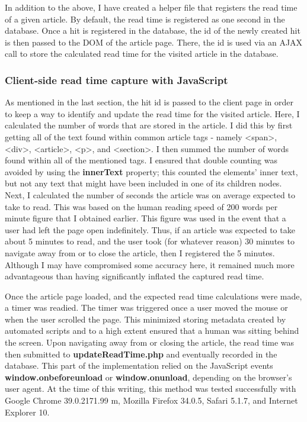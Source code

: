 \documentclass[12pt]{article}
\begin{document}
{In addition to the above, I have created a helper file that registers the read time of a given article. By default, the read time is registered as one second in the database. Once a hit is registered in the database, the id of the newly created hit is then passed to the DOM of the article page. There, the id is used via an AJAX call to store the calculated read time for the visited article in the database. 
\vfill

\subsubsection{Client-side read time capture with JavaScript} 
As mentioned in the last section, the hit id is passed to the client page in order to keep a way to identify and update the read time for the visited article. Here, I calculated the number of words that are stored in the article. I did this by first getting all of the text found within common article tags - namely <span>, <div>, <article>, <p>, and <section>. I then summed the number of words found within all of the mentioned tags. I ensured that double counting was avoided by using the \textbf{innerText} property; this counted the elements' inner text, but not any text that might have been included in one of its children nodes. Next, I calculated the number of seconds the article was on average expected to take to read. This was based on the human reading speed of 200 words per minute figure that I obtained earlier. This figure was used in the event that a user had left the page open indefinitely. Thus, if an article was expected to take about 5 minutes to read, and the user took (for whatever reason) 30 minutes to navigate away from or to close the article, then I registered the 5 minutes. Although I may have compromised some accuracy here, it remained much more advantageous than having significantly inflated the captured read time.

Once the article page loaded, and the expected read time calculations were made, a timer was readied. The timer was triggered once a user moved the mouse or when the user scrolled the page. This minimized storing metadata created by automated scripts and to a high extent ensured that a human was sitting behind the screen. Upon navigating away from or closing the article, the read time was then submitted to \textbf{updateReadTime.php} and eventually recorded in the database. This part of the implementation relied on the JavaScript events \textbf{window.onbeforeunload} or \textbf{window.onunload}, depending on the browser's user agent. At the time of this writing, this method was tested successfully with Google Chrome 39.0.2171.99 m, Mozilla Firefox 34.0.5, Safari 5.1.7, and Internet Explorer 10.
 
}
\end{document}

